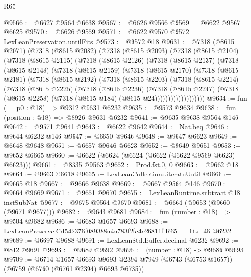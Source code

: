 \begin{lexlean}{R65}
\begin{coremodule}
{@9566 := @6627 @9564 @6638
@9567 := @6626 @9566
@9569 := @6622 @9567 @6625
@9570 := @6626 @9569
@9571 := @6622 @9570
@9572 := LexLeanPreservation.untilFits
@9573 := @9572 @18
@9631 := @7318
    (@8615 @2071)
    (@7318
      (@8615 @2082)
      (@7318
        (@8615 @2093)
        (@7318
          (@8615 @2104)
          (@7318
            (@8615 @2115)
            (@7318
              (@8615 @2126)
              (@7318
                (@8615 @2137)
                (@7318
                  (@8615 @2148)
                  (@7318
                    (@8615 @2159)
                    (@7318
                      (@8615 @2170)
                      (@7318
                        (@8615 @2181)
                        (@7318
                          (@8615 @2192)
                          (@7318
                            (@8615 @2203)
                            (@7318
                              (@8615 @2214)
                              (@7318
                                (@8615 @2225)
                                (@7318
                                  (@8615 @2236)
                                  (@7318
                                    (@8615 @2247)
                                    (@7318
                                      (@8615 @2258)
                                      (@7318 (@8615 @184) (@8615 @24)))))))))))))))))))
@9634 := fun (__p0 : @18) => @9312 @9631 @6232
@9635 := @9573 @9634
@9638 := fun (position : @18) => @8926 @9631 @6232
@9641 := @9635 @9638 @9564 @146
@9642 := @9571 @9641
@9643 := @6622 @9642
@9644 := Nat.beq
@9646 := @9644 @6232 @146
@9647 := @6650 @9646
@9648 := @9647 @6623
@9649 := @6648 @9648
@9651 := @6657 @9646 @6623
@9652 := @9649 @9651
@9653 := @9652 @6665
@9660 := @6622 (@6624 (@6624 (@6622 (@6622 @9569 @6623) @6623)))
@9661 := @8335 @9563
@9662 := Prod.fst.{0, 0}
@9663 := @9662 @18
@9664 := @9663 @6618
@9665 := LexLeanCollections.iterateUntil
@9666 := @9665 @18
@9667 := @9666 @9638
@9669 := @9667 @9564 @146
@9670 := @9664 @9669
@9671 := @9661 @9670
@9675 := LexLeanRuntime.subtract @18 instSubNat
@9677 := @9675 @9564 @9670
@9681 := @6664 (@9653 (@9660 (@9671 @9677)))
@9682 := @9643 @9681
@9684 := fun (number : @18) => @9504 @9682
@9686 := @6683 @1657 @6693
@9688 := LexLeanPreserve.Cd542376f089388a4a783f2fc4c26811f.R65.__fits_46 @6232
@9689 := @6697 @9688
@9691 := LexLeanStd.Buffer.decimal @6232
@9692 := @812 @9691
@9693 := @9689 @9692
@9695 := (number : @18) -> @9686 @9693
@9709 := @6714
    @1657
    @6693
    @9693
    @2394
    @7949
    (@6743 (@6753 @1657))
    (@6759 (@6760 (@6761 @2394) @6693 @6735))
}
\end{coremodule}
\end{lexlean}

